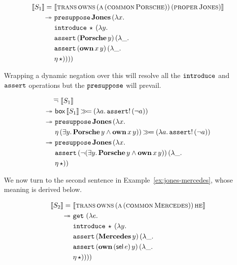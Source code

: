 \begin{align*}
  \sem{S_1} =
     &\ \sem{\appp{\abs{trans}}{\abs{owns}}{(\ap{\abs{a}}{(\ap{\abs{common}}{\abs{Porsche}})})}{(\ap{\abs{proper}}{\abs{Jones}})}} \\
\tto &\ \app{\op{presuppose}}{\obj{Jones}}{(\lam{x}{ \\
     &\ \app{\op{introduce}}{\star}{(\lam{y}{ \\
     &\ \app{\op{assert}}{(\ap{\obj{Porsche}}{y})}{(\lam{\_}{ \\
     &\ \app{\op{assert}}{(\app{\obj{own}}{x}{y})}{(\lam{\_}{ \\
     &\ \etaE{\star}})}})}})}})}
\end{align*}

Wrapping a dynamic negation over this will resolve all the $\mathtt{introduce}$
and $\mathtt{assert}$ operations but the $\mathtt{presuppose}$ will prevail.

\begin{align*}
&\mathop{\overline{\lnot}}\ \llbracket S_1 \rrbracket \\
\twoheadrightarrow &\ \textsf{box}\,\llbracket S_1 \rrbracket \mathbin{\gg\!=} (\lambda a.\, \mathtt{assert}!\,(\lnot a))\\
\twoheadrightarrow &\ \mathtt{presuppose}\,\textbf{Jones}\,(\lambda x.\,  \\
     &\ \eta\,(\exists y.\, \textbf{Porsche}\,y \land \textbf{own}\,x\,y)) \mathbin{\gg\!=} (\lambda a.\, \mathtt{assert}!\,(\lnot a)) \\
\twoheadrightarrow &\ \mathtt{presuppose}\,\textbf{Jones}\,(\lambda x.\,  \\
     &\ \mathtt{assert}\,(\lnot (\exists y.\, \textbf{Porsche}\,y \land \textbf{own}\,x\,y))\,(\lambda \_.\,  \\
     &\ \eta\,\star))
\end{align*}

We now turn to the second sentence in Example~\ref{ex:jones-mercedes},
whose meaning is derived below.

\begin{align*}
  \sem{S_2} =
     &\ \sem{\appp{\abs{trans}}{\abs{owns}}{(\ap{\abs{a}}{(\ap{\abs{common}}{\abs{Mercedes}})})}{\abs{he}}} \\
\tto &\ \app{\op{get}}{}{(\lam{e}{ \\
     &\ \app{\op{introduce}}{\star}{(\lam{y}{ \\
     &\ \app{\op{assert}}{(\ap{\obj{Mercedes}}{y})}{(\lam{\_}{ \\
     &\ \app{\op{assert}}{(\app{\obj{own}}{(\ap{\sel}{e})}{y})}{(\lam{\_}{ \\
     &\ \etaE{\star}})}})}})}})}
\end{align*}

